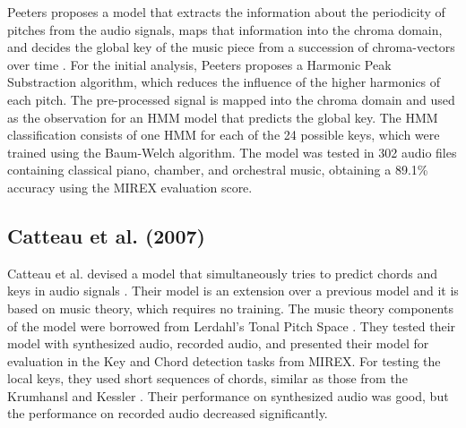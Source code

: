 Peeters proposes a model that extracts the information about the periodicity of pitches from the audio signals, maps that information into the chroma domain, and decides the global key of the music piece from a succession of chroma-vectors over time \cite{peeters2006chromabased}. For the initial analysis, Peeters proposes a Harmonic Peak Substraction algorithm, which reduces the influence of the higher harmonics of each pitch. The pre-processed signal is mapped into the chroma domain and used as the observation for an HMM model that predicts the global key. The HMM classification consists of one HMM for each of the 24 possible keys, which were trained using the Baum-Welch algorithm. The model was tested in 302 audio files containing classical piano, chamber, and orchestral music, obtaining a 89.1\% accuracy using the MIREX evaluation score.



\subsection{Catteau et al. (2007)}
Catteau et al. devised a model that simultaneously tries to predict chords and keys in audio signals \cite{catteau2007probabilistic}. Their model is an extension over a previous model \cite{bello2005robust} and it is based on music theory, which requires no training. The music theory components of the model were borrowed from Lerdahl's Tonal Pitch Space \cite{lerdahl2005tonal}. They tested their model with synthesized audio, recorded audio, and presented their model for evaluation in the Key and Chord detection tasks from MIREX. For testing the local keys, they used short sequences of chords, similar as those from the Krumhansl and Kessler \cite{krumhansl1982tracing}. Their performance on synthesized audio was good, but the performance on recorded audio decreased significantly.

